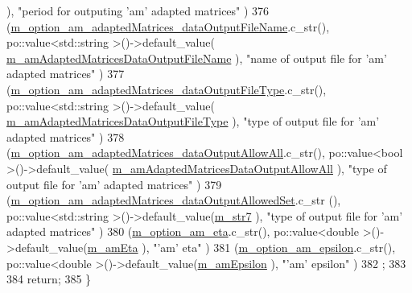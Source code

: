 \begin{DoxyCode}
              ), \textcolor{stringliteral}{"period for outputing 'am' adapted matrices"}                      )
376     (\hyperlink{class_q_u_e_s_o_1_1_m_l_sampling_level_options_a50b0b030e51402badf96072ea3add0ba}{m\_option\_am\_adaptedMatrices\_dataOutputFileName}.c\_str(), 
           po::value<std::string >()->default\_value(
      \hyperlink{class_q_u_e_s_o_1_1_m_l_sampling_level_options_a7dde9af112143992a87a72635e63a864}{m\_amAdaptedMatricesDataOutputFileName}      ), \textcolor{stringliteral}{"name of output file for
       'am' adapted matrices"}                   )
377     (\hyperlink{class_q_u_e_s_o_1_1_m_l_sampling_level_options_adaf47c65997276c4e7a2e5437a49f5eb}{m\_option\_am\_adaptedMatrices\_dataOutputFileType}.c\_str(), 
           po::value<std::string >()->default\_value(
      \hyperlink{class_q_u_e_s_o_1_1_m_l_sampling_level_options_ab209a7f5dac6c2b4e108a7a1829631c6}{m\_amAdaptedMatricesDataOutputFileType}      ), \textcolor{stringliteral}{"type of output file for
       'am' adapted matrices"}                   )
378     (\hyperlink{class_q_u_e_s_o_1_1_m_l_sampling_level_options_a455507e07fb1494b26f4b387a72ca7b3}{m\_option\_am\_adaptedMatrices\_dataOutputAllowAll}.c\_str(), 
           po::value<bool        >()->default\_value(
      \hyperlink{class_q_u_e_s_o_1_1_m_l_sampling_level_options_ad1ac51fd4b35c5decca04048ebeca3f2}{m\_amAdaptedMatricesDataOutputAllowAll}      ), \textcolor{stringliteral}{"type of output file for
       'am' adapted matrices"}                   )
379     (\hyperlink{class_q_u_e_s_o_1_1_m_l_sampling_level_options_a28e11986f1c955a367517086890f42bc}{m\_option\_am\_adaptedMatrices\_dataOutputAllowedSet}.c\_str
      (),    po::value<std::string >()->default\_value(\hyperlink{class_q_u_e_s_o_1_1_m_l_sampling_level_options_a062489e53dd259c548d7ea9ed9428377}{m\_str7}                                     ), \textcolor{stringliteral}{"type of
       output file for 'am' adapted matrices"}                   )
380     (\hyperlink{class_q_u_e_s_o_1_1_m_l_sampling_level_options_a6fb0d64c285c2a3411fb24667a03f747}{m\_option\_am\_eta}.c\_str(),                                     po::value<double      >()-
      >default\_value(\hyperlink{class_q_u_e_s_o_1_1_m_l_sampling_level_options_a87fe9b1c390bf7bff2ecc329064e7618}{m\_amEta}                                    ), \textcolor{stringliteral}{"'am' eta"}                              
                                )
381     (\hyperlink{class_q_u_e_s_o_1_1_m_l_sampling_level_options_a5ecc043caa63c4a6980ed61f370bd59a}{m\_option\_am\_epsilon}.c\_str(),                                 po::value<double     
       >()->default\_value(\hyperlink{class_q_u_e_s_o_1_1_m_l_sampling_level_options_abf07f60a5115657e18d39a586a8093ac}{m\_amEpsilon}                                ), \textcolor{stringliteral}{"'am' epsilon"}                  
                                        )
382   ;
383 
384   \textcolor{keywordflow}{return};
385 \}
\end{DoxyCode}
